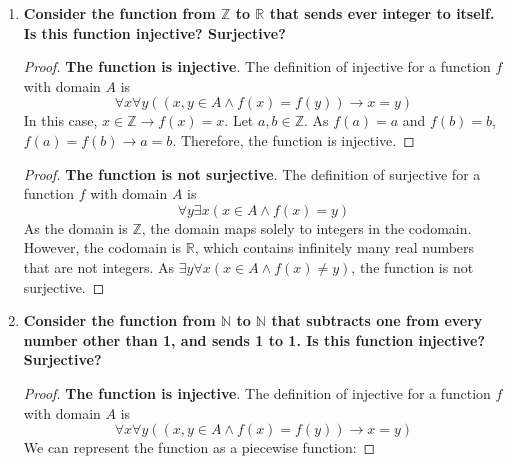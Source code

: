 \documentclass[article, 12pt]{article}
\theoremstyle{definition}
\newcommand{\reals}{\mathbb{R}} %
\newcommand{\ints}{\mathbb{Z}}
\newcommand{\nats}{\mathbb{N}}
\begin{document}
\begin{enumerate}[(1)]
        \begin{proof}
            \textbf{The function is injective}. The definition of injective for a function $f$ with domain $A$ is \[ \forall x \forall y((x,y \in A \land f(x) = f(y)) \to x = y) \] In this case, $f(x) = x+1$ and $f(y) = y+1$, so if $f(x) = f(y)$, then $x+1 = y+1 \to x = y$. Therefore, the function is injective.
        \end{proof}
        \begin{proof}
            \textbf{The function is surjective}. The definition of surjective for a function $f$ with domain $A$ is \[ \forall y \exists x(x \in A \land f(x) = y) \] In this case, $f(x) = x+1$. For all elements in the codomain, there exists a preimage in the domain, $x = y-1$. Therefore, the function is surjective.
        \end{proof}
        \item \textbf{Consider the function from $\ints$ to $\reals$ that sends ever integer to itself. Is this function injective? Surjective?}
        \begin{proof}
            \textbf{The function is injective}. The definition of injective for a function $f$ with domain $A$ is \[ \forall x \forall y((x,y \in A \land f(x) = f(y)) \to x = y) \] In this case, $x \in \ints \to f(x) = x$. Let $a,b \in \ints$. As $f(a) = a$ and $f(b) = b$, $f(a) = f(b) \to a = b$. Therefore, the function is injective.
        \end{proof}
        \begin{proof}
            \textbf{The function is not surjective}. The definition of surjective for a function $f$ with domain $A$ is \[ \forall y \exists x(x \in A \land f(x) = y) \] As the domain is $\ints$, the domain maps solely to integers in the codomain. However, the codomain is $\reals$, which contains infinitely many real numbers that are not integers. As $\exists y \forall x (x \in A \land f(x) \neq y)$, the function is not surjective.
        \end{proof}
        \item \textbf{Consider the function from $\nats$ to $\nats$ that subtracts one from every number other than 1, and sends 1 to 1. Is this function injective? Surjective?}
        \begin{proof}
            \textbf{The function is injective}. The definition of injective for a function $f$ with domain $A$ is \[ \forall x \forall y((x,y \in A \land f(x) = f(y)) \to x = y) \]
            We can represent the function as a piecewise function:

\end{proof}
\end{enumerate}
\end{document}
